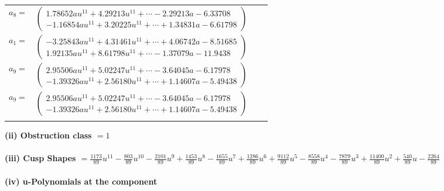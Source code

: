 \documentclass[1p]{elsarticle_modified}
\theoremstyle{definition}
\begin{document}
\begin{tabular}{m{7pt} m{180pt} m{7pt} m{180pt} }
\flushright $a_{8}=$&$\begin{pmatrix}1.78652 a u^{11}+4.29213 u^{11}+\cdots-2.29213 a-6.33708\\-1.16854 a u^{11}+3.20225 u^{11}+\cdots+1.34831 a-6.61798\end{pmatrix}$ \\
\flushright $a_{1}=$&$\begin{pmatrix}-3.25843 a u^{11}+4.31461 u^{11}+\cdots+4.06742 a-8.51685\\1.92135 a u^{11}+8.61798 u^{11}+\cdots-1.37079 a-11.9438\end{pmatrix}$ \\
\flushright $a_{9}=$&$\begin{pmatrix}2.95506 a u^{11}+5.02247 u^{11}+\cdots-3.64045 a-6.17978\\-1.39326 a u^{11}+2.56180 u^{11}+\cdots+1.14607 a-5.49438\end{pmatrix}$\\ \flushright $a_{9}=$&$\begin{pmatrix}2.95506 a u^{11}+5.02247 u^{11}+\cdots-3.64045 a-6.17978\\-1.39326 a u^{11}+2.56180 u^{11}+\cdots+1.14607 a-5.49438\end{pmatrix}$\\&\end{tabular}
\flushleft \textbf{(ii) Obstruction class $= 1$}\\~\\
\flushleft \textbf{(iii) Cusp Shapes $= \frac{1173}{89} u^{11}-\frac{803}{89} u^{10}-\frac{2101}{89} u^9+\frac{1453}{89} u^8-\frac{1655}{89} u^7+\frac{1286}{89} u^6+\frac{9112}{89} u^5-\frac{8558}{89} u^4-\frac{7879}{89} u^3+\frac{11400}{89} u^2+\frac{540}{89} u-\frac{2264}{89}$}\\~\\
\newpage\renewcommand{\arraystretch}{1}
\flushleft \textbf{(iv) u-Polynomials at the component}\newline \\
\end{document}
